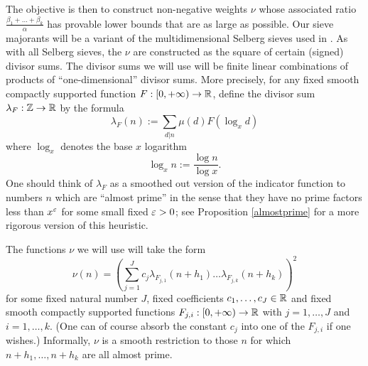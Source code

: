 The objective is then to construct non-negative weights $\nu$ whose associated ratio $\frac{\beta_1+\dots+\beta_k}{\alpha}$ has provable lower bounds that are as large as possible.   Our sieve majorants will be a variant of the multidimensional Selberg sieves used in \cite{maynard-new}.  As with all Selberg sieves, the $\nu$ are constructed as the square of certain (signed) divisor sums.  The divisor sums we will use will be finite linear combinations of products of ``one-dimensional'' divisor sums.  More precisely, for any fixed smooth compactly supported function $F: [0,+\infty) \to \mathbb{R}$, define the divisor sum $\lambda_F: \mathbb{Z} \to \mathbb{R}$ by the formula
\begin{equation}\label{lambdaf-def}
\lambda_F(n) := \sum_{d|n} \mu(d) F( \log_x d )
\end{equation}
where $\log_x$ denotes the base $x$ logarithm
\begin{equation}\label{logx-def}
\log_x n:= \frac{\log n}{\log x}.
\end{equation}
One should think of $\lambda_F$ as a smoothed out version of the indicator function to numbers $n$ which are ``almost prime'' in the sense that they have no prime factors less than $x^\varepsilon$ for some small fixed $\varepsilon>0$; see Proposition \ref{almostprime} for a more rigorous version of this heuristic.

The functions $\nu$ we will use will take the form
\begin{equation}\label{nuform}
 \nu(n) = \left( \sum_{j=1}^J c_j \lambda_{F_{j,1}}(n+h_1) \dots \lambda_{F_{j,k}}(n+h_k) \right)^2 
\end{equation}
for some fixed natural number $J$, fixed coefficients $c_1,\dots,c_J \in \mathbb{R}$ and fixed smooth compactly supported functions $F_{j,i}: [0,+\infty) \to \mathbb{R}$ with $j=1,\dots,J$ and $i=1,\dots,k$.  (One can of course absorb the constant $c_j$ into one of the $F_{j,i}$ if one wishes.)   Informally, $\nu$ is a smooth restriction to those $n$ for which $n+h_1,\dots,n+h_k$ are all almost prime.

